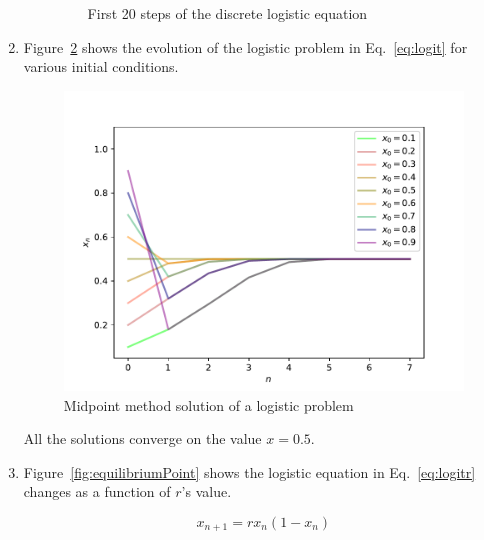 \documentclass[12pt,a4]{article}
\begin{document}
\begin{enumerate}
\begin{enumerate}
\begin{figure}[H]
          \caption{First 20 steps of the discrete logistic equation}
          \label{fig:first20}
        \end{figure}
    \end{enumerate}
  \item
    Figure~\ref{fig:multipleConvergences} shows the evolution of the logistic problem in Eq.~\ref{eq:logit} for various initial conditions.

    \begin{figure}[H]
      \centering
      \includegraphics[scale = 0.6]{../figs/multipleConvergences.pdf}
      \caption{Midpoint method solution of a logistic problem}
      \label{fig:multipleConvergences}
    \end{figure}

    All the solutions converge on the value $x = 0.5$.

  \item
    Figure~\ref{fig:equilibriumPoint} shows the logistic equation in Eq.~\ref{eq:logitr} changes as a function of $r$'s value.

    \begin{equation}
      x_{n + 1} = r x_{n} (1 - x_{n}) 
      \label{eq:logitr}
    \end{equation}


\end{enumerate}
\end{document}
